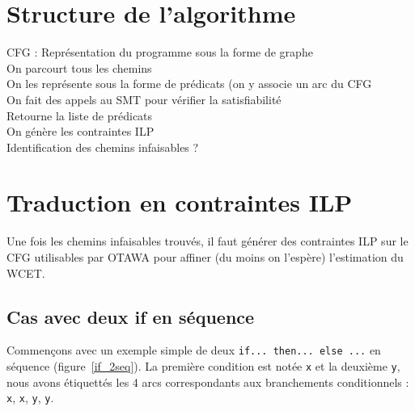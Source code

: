\documentclass[french]{article}
\begin{document}
  \section{Structure de l'algorithme}
  CFG : Représentation du programme sous la forme de graphe\\
  On parcourt tous les chemins\\
  On les représente sous la forme de prédicats (on y associe un arc du CFG\\
  On fait des appels au SMT pour vérifier la satisfiabilité\\
  Retourne la liste de prédicats\\
  On génère les contraintes ILP\\
  
  Identification des chemins infaisables ?
  
  \section{Traduction en contraintes ILP}
  Une fois les chemins infaisables trouvés, il faut générer des contraintes ILP sur le CFG utilisables par OTAWA pour affiner (du moins on l'espère) l'estimation du WCET.
  
  \subsection{Cas avec deux if en séquence}
  Commençons avec un exemple simple de deux \texttt{if... then... else ...} en séquence (figure~\ref{if_2seq}). La première condition est notée \texttt{x} et la deuxième \texttt{y}, nous avons étiquettés les 4 arcs correspondants aux branchements conditionnels : \texttt{x}, \texttt{\textlnot x}, \texttt{y}, \texttt{\textlnot y}.
  
\end{document}
